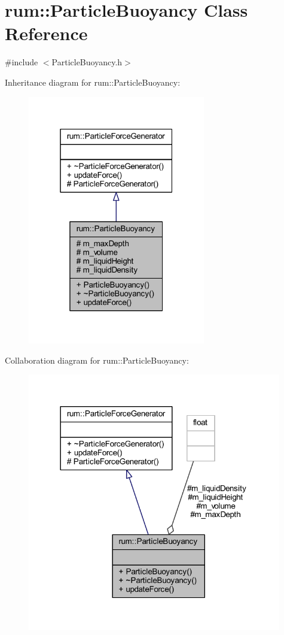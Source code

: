 \hypertarget{classrum_1_1_particle_buoyancy}{}\section{rum\+:\+:Particle\+Buoyancy Class Reference}
\label{classrum_1_1_particle_buoyancy}


{\ttfamily \#include $<$Particle\+Buoyancy.\+h$>$}



Inheritance diagram for rum\+:\+:Particle\+Buoyancy\+:\nopagebreak
\begin{figure}[H]
\begin{center}
\leavevmode
\includegraphics[width=220pt]{classrum_1_1_particle_buoyancy__inherit__graph}
\end{center}
\end{figure}


Collaboration diagram for rum\+:\+:Particle\+Buoyancy\+:\nopagebreak
\begin{figure}[H]
\begin{center}
\leavevmode
\includegraphics[width=314pt]{classrum_1_1_particle_buoyancy__coll__graph}
\end{center}
\end{figure}
